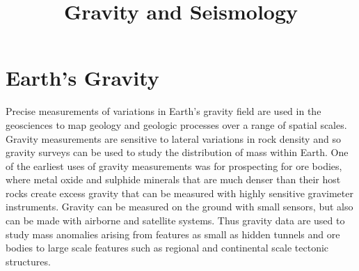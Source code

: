 \documentclass[11pt, oneside]{article}   	%
\date{}							%
\begin{document}
\title{\bf Gravity and Seismology }

\maketitle
 

\section*{Earth's Gravity}
Precise measurements of variations in Earth's gravity field are used in the geosciences to map  geology and geologic processes over a range of spatial scales. Gravity measurements are sensitive to  lateral variations in rock density and so gravity surveys can be used to study the distribution of mass within Earth.  One of the earliest uses of gravity measurements was for prospecting for ore bodies, where metal oxide and sulphide minerals that are much denser than their host rocks  create excess gravity that can be measured with highly sensitive gravimeter instruments. Gravity  can be measured on the ground with small  sensors, but also can be made with airborne and satellite systems. Thus gravity data are used to study  mass anomalies arising from features as small as hidden tunnels and ore bodies to large scale features such as regional and continental scale tectonic structures. 
\end{document}
